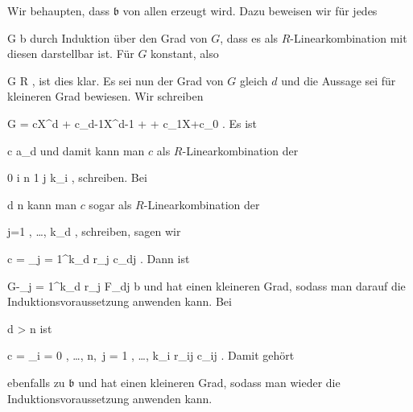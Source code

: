 {Wir behaupten, dass ${\mathfrak b}$ von allen
 erzeugt wird. Dazu beweisen wir für jedes

\mavergleichskette
{\vergleichskette
{ G
}
{ \in }{ {\mathfrak b}
}
{  }{
}
{    }{
}
{   }{
}
}
{}{}{}
durch Induktion über den Grad von $G$, dass es als $R$-Linearkombination mit diesen
 darstellbar ist. Für $G$ konstant, also

\mavergleichskette
{\vergleichskette
{ G
}
{ \in }{ R
}
{  }{
}
{    }{
}
{   }{
}
}
{}{}{,}
ist dies klar. Es sei nun der Grad von $G$ gleich $d$ und die Aussage sei für kleineren Grad bewiesen. Wir schreiben

\mavergleichskettedisp
{\vergleichskette
{ G
}
{ =} { cX^d + c_{d-1}X^{d-1} + \cdots + c_1X+c_0
}
{ } {
}
{ } {
}
{ } {
}
}
{}{}{.}
Es ist

\mavergleichskette
{\vergleichskette
{ c
}
{ \in }{ {\mathfrak a}_d
}
{  }{
}
{    }{
}
{   }{
}
}
{}{}{}
und damit kann man $c$ als $R$-Linearkombination der

 {}
 {0 \leq i \leq n} {}
 {1 \leq j \leq k_i} {} {} {,}
schreiben. Bei

\mavergleichskette
{\vergleichskette
{ d
}
{ \leq }{ n
}
{  }{
}
{    }{
}
{   }{
}
}
{}{}{}
kann man $c$ sogar als $R$-Linearkombination der

 {}
 {j=1 , \ldots , k_d} {}
 {} {} {} {,}
schreiben, sagen wir

\mavergleichskette
{\vergleichskette
{ c
}
{ = }{ \sum_{j = 1}^{k_d} r_j c_{dj}
}
{  }{
}
{    }{
}
{   }{
}
}
{}{}{.}
Dann ist

\mavergleichskette
{\vergleichskette
{ G-\sum_{j = 1}^{k_d} r_j F_{dj}
}
{ \in }{ {\mathfrak b}
}
{  }{
}
{    }{
}
{   }{
}
}
{}{}{}
und hat einen kleineren Grad, sodass man darauf die Induktionsvoraussetzung anwenden kann. Bei

\mavergleichskette
{\vergleichskette
{ d
}
{ > }{ n
}
{  }{
}
{    }{
}
{   }{
}
}
{}{}{}
ist

\mavergleichskettedisp
{\vergleichskette
{ c
}
{ =} { \sum_{i = 0 , \ldots ,  n,\, j = 1 , \ldots ,  k_i } r_{ij} c_{ij}
}
{ } {
}
{ } {
}
{ } {
}
}
{}{}{.}
Damit gehört

 {  }

ebenfalls zu ${\mathfrak b}$ und hat einen kleineren Grad, sodass man wieder die Induktionsvoraussetzung anwenden kann.




}








